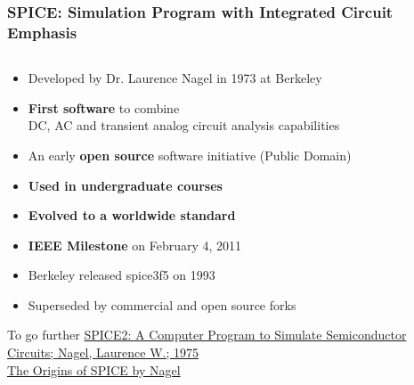 
\begin{frame}
  \frametitle{SPICE: Simulation Program with Integrated Circuit Emphasis}
  \begin{columns}
    \begin{column}{.7\textwidth}
      \begin{itemize}
      \item Developed by Dr. Laurence Nagel in 1973 at Berkeley %
      \item \textbf{First software} to combine \\
        DC, AC and transient analog circuit analysis capabilities
      \item An early \textbf{open source} software initiative (Public Domain)
      \item \textbf{Used in undergraduate courses}
      \item \textbf{Evolved to a worldwide standard} %
      \item \textbf{IEEE Milestone} on February 4, 2011
      \item Berkeley released spice3f5 on 1993 %
      \item Superseded by commercial and open source forks \\[1em]
      \end{itemize}
      {\tiny
        \begin{tabbing}
        To go further \=
        \href{https://www2.eecs.berkeley.edu/Pubs/TechRpts/1975/9602.html}%
        {SPICE2: A Computer Program to Simulate Semiconductor Circuits; Nagel, Laurence W.; 1975} \\
        \> \href{http://www.omega-enterprises.net/The\%20Origins\%20of\%20SPICE.html}{The Origins of SPICE by Nagel}
        \end{tabbing}

}
\end{column}
\end{columns}
\end{frame}
